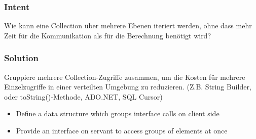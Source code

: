 \subsubsection{Intent}
Wie kann eine Collection über mehrere Ebenen iteriert werden, ohne dass mehr Zeit für die Kommunikation als für die Berechnung benötigt wird?

\subsubsection{Solution}
Gruppiere mehrere Collection-Zugriffe zusammen, um die Kosten für mehrere Einzelzugriffe in einer verteilten Umgebung zu reduzieren. (Z.B. String Builder, oder toString()-Methode, ADO.NET, SQL Cursor)

\begin{itemize}
    \item Define a data structure which groups interface calls on client side
    \item Provide an interface on servant to access groups of elements at once
\end{itemize}
